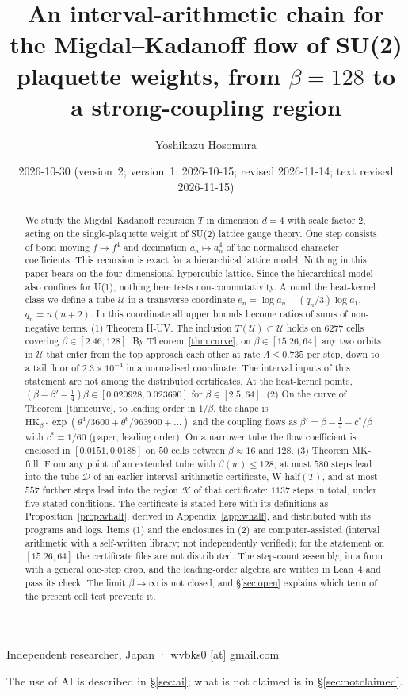 \documentclass[11pt,a4paper]{article}
\title{An interval-arithmetic chain for the Migdal--Kadanoff flow of SU(2) plaquette weights, from $\beta=128$ to a strong-coupling region}
\author{Yoshikazu Hosomura}
\date{2026-10-30 (version~2; version~1: 2026-10-15; revised 2026-11-14; text revised 2026-11-15)}
\theoremstyle{definition}
\theoremstyle{remark}
\newcommand{\HK}{\mathrm{HK}}
\newcommand{\cU}{\mathcal{U}}
\newcommand{\cD}{\mathcal{D}}
\newcommand{\cK}{\mathcal{K}}
\newcommand{\IA}{computer-assisted (interval arithmetic with a self-written library; not independently verified)}
\begin{document}
\maketitle
\begin{center}\small Independent researcher, Japan · wvbks0 [at] gmail.com\end{center}
\begin{center}\small The use of AI is described in \S\ref{sec:ai}; what is not claimed is in \S\ref{sec:notclaimed}.\end{center}

\begin{abstract}
We study the Migdal--Kadanoff recursion $T$ in dimension $d=4$ with scale factor $2$, acting on the single-plaquette weight of SU(2) lattice gauge theory.
One step consists of bond moving $f\mapsto f^4$ and decimation $a_n\mapsto a_n^4$ of the normalised character coefficients.
This recursion is exact for a hierarchical lattice model.
Nothing in this paper bears on the four-dimensional hypercubic lattice.
Since the hierarchical model also confines for U(1), nothing here tests non-commutativity.
Around the heat-kernel class we define a tube $\cU$ in a transverse coordinate $e_n=\log a_n-(q_n/3)\log a_1$, $q_n=n(n+2)$.
In this coordinate all upper bounds become ratios of sums of non-negative terms.
(1) Theorem H-UV. The inclusion $T(\cU)\subset\cU$ holds on $6277$ cells covering $\beta\in[2.46,128]$.
By Theorem~\ref{thm:curve}, on $\beta\in[15.26,64]$ any two orbits in $\cU$ that enter from the top approach each other at rate $\Lambda\le 0.735$ per step, down to a tail floor of $2.3\times10^{-4}$ in a normalised coordinate.
The interval inputs of this statement are not among the distributed certificates.
At the heat-kernel points, $(\beta-\beta'-\tfrac14)\beta\in[0.020928,0.023690]$ for $\beta\in[2.5,64]$.
(2) On the curve of Theorem~\ref{thm:curve}, to leading order in $1/\beta$, the shape is $\HK_\beta\cdot\exp(\theta^4/3600+\theta^6/963900+\dots)$ and the coupling flows as $\beta'=\beta-\tfrac14-c^*/\beta$ with $c^*=1/60$ (paper, leading order).
On a narrower tube the flow coefficient is enclosed in $[0.0151,0.0188]$ on $50$ cells between $\beta\approx16$ and $128$.
(3) Theorem MK-full. From any point of an extended tube with $\beta(w)\le128$, at most $580$ steps lead into the tube $\cD$ of an earlier interval-arithmetic certificate, W-half$(T)$, and at most $557$ further steps lead into the region $\cK$ of that certificate: $1137$ steps in total, under five stated conditions.
The certificate is stated here with its definitions as Proposition~\ref{prop:whalf}, derived in Appendix~\ref{app:whalf}, and distributed with its programs and logs.
Items (1) and the enclosures in (2) are \IA{}; for the statement on $[15.26,64]$ the certificate files are not distributed.
The step-count assembly, in a form with a general one-step drop, and the leading-order algebra are written in Lean~4 and pass its check.
The limit $\beta\to\infty$ is not closed, and \S\ref{sec:open} explains which term of the present cell test prevents it.
\end{abstract}
\end{document}
